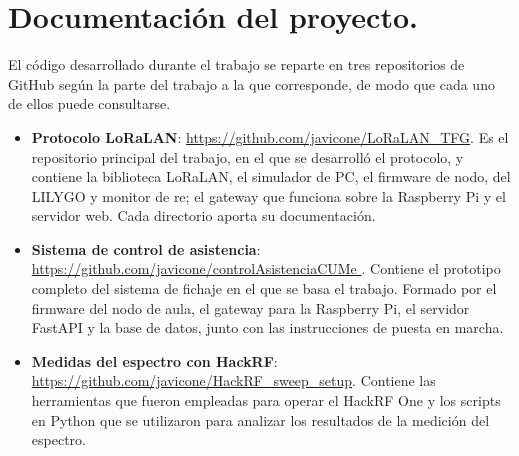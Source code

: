 \chapter{Documentación del proyecto.}
\label{anexo:repos}

El código desarrollado durante el trabajo se reparte en tres repositorios de GitHub según la parte del trabajo a la que corresponde, de modo que cada uno de ellos puede consultarse.

\begin{itemize}
\item \textbf{Protocolo LoRaLAN}: \url{https://github.com/javicone/LoRaLAN_TFG}. Es el repositorio principal del trabajo, en el que se desarrolló el protocolo, y contiene la biblioteca LoRaLAN, el simulador de PC, el firmware de nodo, del LILYGO y monitor de re; el gateway que funciona sobre la Raspberry Pi y el servidor web. Cada directorio aporta su documentación.

\item \textbf{Sistema de control de asistencia}: 
\url{https://github.com/javicone/controlAsistenciaCUMe              }. Contiene el prototipo completo del sistema de fichaje en el que se basa el trabajo. Formado por el firmware del nodo de aula, el gateway para la Raspberry Pi, el servidor FastAPI y la base de datos, junto con las instrucciones de puesta en marcha.

\item \textbf{Medidas del espectro con HackRF}: \url{https://github.com/javicone/HackRF_sweep_setup}. Contiene las herramientas que fueron empleadas para operar el HackRF One y los scripts en Python que se utilizaron para analizar los resultados de la medición del espectro.
\end{itemize}
